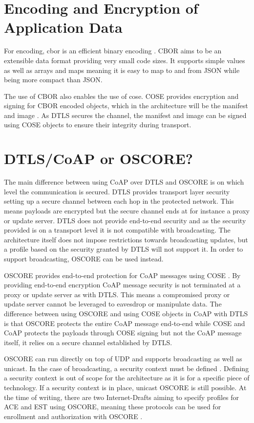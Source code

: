 \documentclass[0-thesis.tex]{subfiles}
\begin{document}
\section{Encoding and Encryption of Application Data}
\label{sec:encoding-encryption}
For encoding, \gls{cbor} is an efficient binary encoding \parencite{rfc7049}. CBOR aims to
be an extensible data format providing very small code sizes. It supports simple values as
well as arrays and maps meaning it is easy to map to and from JSON while being more
compact than JSON. 

The use of CBOR also enables the use of \gls{cose}. COSE provides encryption and signing
for CBOR encoded objects, which in the architecture will be the manifest and image
\parencite{rfc8152}. As DTLS secures the channel, the manifest and image can be signed
using COSE objects to ensure their integrity during transport. 

\section{DTLS/CoAP or OSCORE?}
\label{sec:dtls-coap-or-oscore}
The main difference between using CoAP over DTLS and OSCORE is on which level the
communication is secured. DTLS provides transport layer security setting up a secure
channel between each hop in the protected network. This means payloads are encrypted but
the secure channel ends at for instance a proxy or update server. DTLS does not provide
end-to-end security and as the security provided is on a transport level it is not
compatible with broadcasting. The architecture itself does not impose restrictions towards
broadcasting updates, but a profile based on the security granted by DTLS will not support
it. In order to support broadcasting, OSCORE can be used instead.

OSCORE provides end-to-end protection for CoAP messages using COSE \parencite{oscore}. By
providing end-to-end encryption CoAP message security is not terminated at a proxy or
update server as with DTLS. This means a compromised proxy or update server cannot be
leveraged to eavesdrop or manipulate data. The difference between using OSCORE and using
COSE objects in CoAP with DTLS is that OSCORE protects the entire CoAP message end-to-end
while COSE and CoAP protects the payloads through COSE signing but not the CoAP message
itself, it relies on a secure channel established by DTLS.

OSCORE can run directly on top of UDP and supports broadcasting as well as unicast. In the
case of broadcasting, a security context must be defined \parencite{oscore-group}.
Defining a security context is out of scope for the architecture as it is for a specific
piece of technology. If a security context is in place, unicast OSCORE is still possible.
At the time of writing, there are two Internet-Drafts aiming to specify profiles for ACE
and EST using OSCORE, meaning these protocols can be used for enrollment and authorization
with OSCORE \parencite{ace-oscore, est-oscore}.
\end{document}
